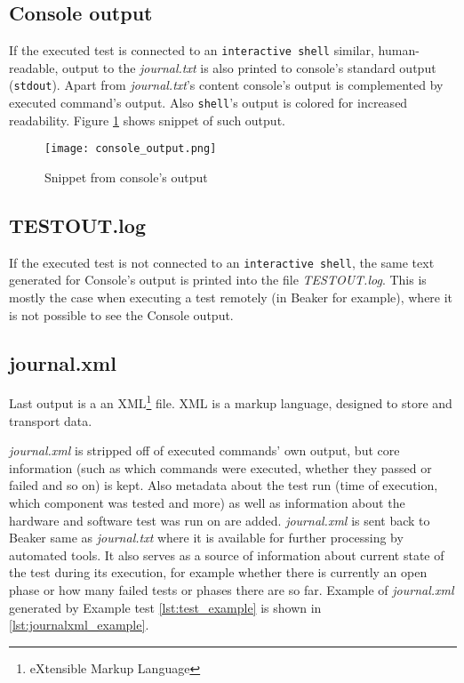 \subsection{Console output}
\label{console_out}
If the executed test is connected to an \texttt{interactive shell} similar, human-readable, output to the \textit{journal.txt} is also printed to console's standard output (\texttt{stdout}). Apart from  \textit{journal.txt}'s content console's output is complemented by executed command's output. Also \texttt{shell}'s output is colored for increased readability.  Figure \ref{fig:console_output} shows snippet of such output.

\begin{figure}
  \texttt{[image: console\_output.png]}
  \caption{Snippet from console's output}
  \label{fig:console_output}
\end{figure}

\subsection{TESTOUT.log}
If the executed test is not connected to an \texttt{interactive shell}, the same text generated for Console's output is printed into the file \textit{TESTOUT.log}. This is mostly the case when executing a test remotely (in Beaker for example), where it is not possible to see the Console output.

\subsection{journal.xml}
Last output is a an XML\footnote{eXtensible Markup Language} file. XML is a markup language, designed to store and transport data\cite{xml_intro}.

\textit{journal.xml} is stripped off of executed commands' own output, but core information (such as which commands were executed, whether they passed or failed and so on) is kept. Also metadata about the test run (time of execution, which component was tested and more) as well as information about the hardware and software test was run on are added. \textit{journal.xml} is sent back to Beaker same as \textit{journal.txt} where it is available for further processing by automated tools. It also serves as a source of information about current state of the test during its execution, for example whether there is currently an open phase or how many failed tests or phases there are so far. Example of \textit{journal.xml} generated by Example test \ref{lst:test_example} is shown in \ref{lst:journalxml_example}.


